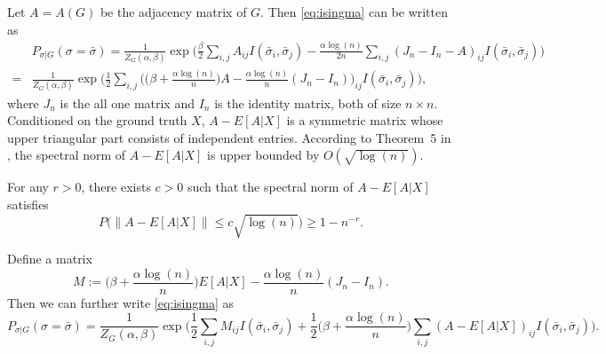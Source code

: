 \documentclass{article}
\begin{document}
Let $A=A(G)$ be the adjacency matrix of $G$. Then \eqref{eq:isingma} can be written as
\begin{align*}
& P_{\sigma|G}(\sigma=\bar{\sigma})=\frac{1}{Z_G(\alpha,\beta)}
\exp\Big(\frac{\beta}{2} \sum_{i,j} A_{ij} I(\bar{\sigma}_i,\bar{\sigma}_j)
-\frac{\alpha\log(n)}{2n} \sum_{i,j} (J_n-I_n-A)_{ij} I(\bar{\sigma}_i, \bar{\sigma}_j)
\Big)  \\
= & \frac{1}{Z_G(\alpha,\beta)}
\exp\Big( \frac{1}{2} \sum_{i,j} \Big( \big(\beta+\frac{\alpha\log(n)}{n} \big) A
-\frac{\alpha\log(n)}{n} (J_n-I_n) \Big)_{ij} I(\bar{\sigma}_i,\bar{\sigma}_j)
\Big),
\end{align*}
where $J_n$ is the all one matrix and $I_n$ is the identity matrix, both of size $n\times n$.
Conditioned on the ground truth $X$,
$A-E[A|X]$ is a symmetric matrix whose upper triangular part consists of independent entries. According to Theorem~5 in \cite{Hajek16}, the spectral norm of $A-E[A|X]$ is upper bounded by $O(\sqrt{\log(n)})$.
\begin{theorem} \label{thm:a2}
For any $r>0$, there exists $c>0$ such that the spectral norm of $A-E[A|X]$ satisfies
$$
P\big(\|A-E[A|X]\| \le c\sqrt{\log(n)} \big)\ge 1-n^{-r} .
$$
\end{theorem}
Define a matrix
$$
M:= \big(\beta+\frac{\alpha\log(n)}{n} \big) E[A|X]
-\frac{\alpha\log(n)}{n} (J_n-I_n).
$$
Then we can further write \eqref{eq:isingma}
as
\begin{equation} \label{eq:M}
P_{\sigma|G}(\sigma=\bar{\sigma})
= \frac{1}{Z_G(\alpha,\beta)}
\exp\Big( \frac{1}{2} \sum_{i,j}M_{ij} I(\bar{\sigma}_i, \bar{\sigma}_j) + \frac{1}{2}\big(\beta+\frac{\alpha\log(n)}{n} \big)  \sum_{i,j}  (A-E[A|X])_{ij}
 I(\bar{\sigma}_i, \bar{\sigma}_j)  
\Big)  .
\end{equation}
\end{document}
